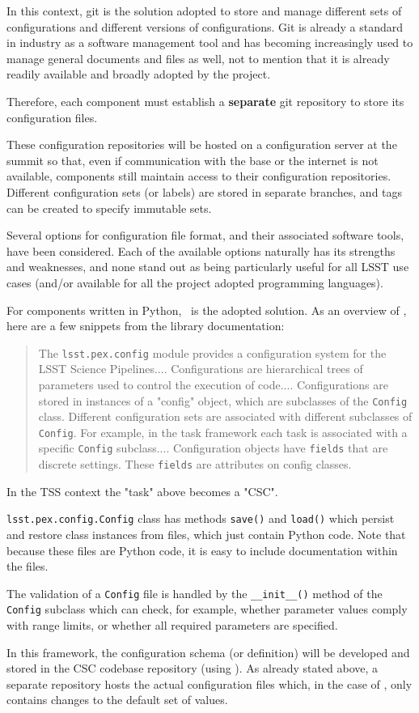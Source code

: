 In this context, git is the solution adopted to store and manage different sets of configurations and different versions of configurations. Git is already a standard in industry as a software management tool and has becoming increasingly used to manage general documents and files as well, not to mention that it is already readily available and broadly adopted by the project. {\color{blue} Therefore, each component must establish a {\bf separate} git repository to store its configuration files.

These configuration repositories will be hosted on a configuration server at the summit so that, even if communication with the base or the internet is not available, components still maintain access to their configuration repositories. Different configuration sets (or labels) are stored in separate branches, and tags can be created to specify immutable sets.

Several options for configuration file format, and their associated software tools, have been considered. Each of the available options naturally has its strengths and weaknesses, and none stand out as being particularly useful for all LSST use cases (and/or available for all the project adopted programming languages).

For components written in Python, \pexC~is the adopted solution. As an overview of \pexC, here are a few snippets from the library documentation:

\begin{quotation}
The \texttt{lsst.pex.config} module provides a configuration system for the LSST Science Pipelines.... Configurations are hierarchical trees of parameters used to control the execution of code.... Configurations are stored in instances of a "config" object, which are subclasses of the \texttt{Config} class. Different configuration sets are associated with different subclasses of \texttt{Config}. For example, in the task framework each task is associated with a specific \texttt{Config} subclass.... Configuration objects have \texttt{fields} that are discrete settings. These \texttt{fields} are attributes on config classes.
\end{quotation}

In the TSS context the "task" above becomes a "CSC".

\texttt{lsst.pex.config.Config} class has methods \texttt{save()} and \texttt{load()} which persist and restore class instances from files, which just contain Python code. Note that because these files are Python code, it is easy to include documentation within the files.

The validation of a \texttt{Config} file is handled by the \texttt{\_\_init\_\_()} method of the \texttt{Config} subclass which can check, for example, whether parameter values comply with range limits, or whether all required parameters are specified.

In this framework, the configuration schema (or definition) will be developed and stored in the CSC codebase repository (using \pexC). As already stated above, a separate repository hosts the actual configuration files which, in the case of \pexC, only contains changes to the default set of values.}







